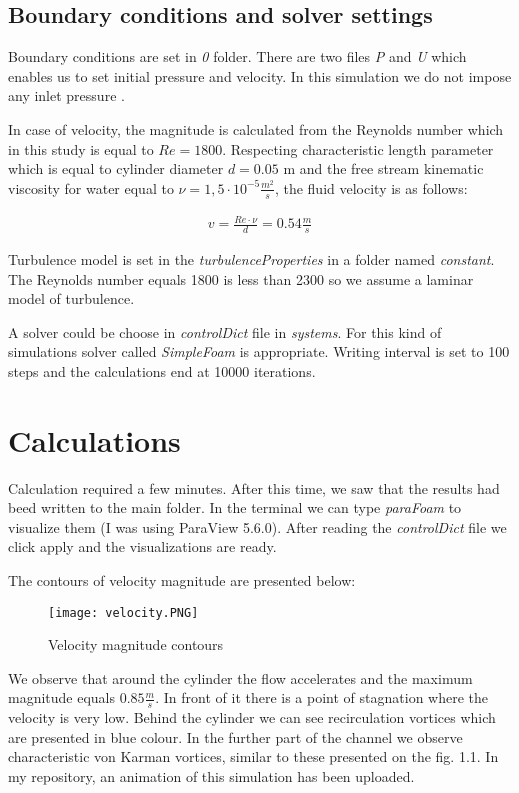 \documentclass[a4paper,11pt]{article}
\begin{document}
\subsection{Boundary conditions and solver settings}

Boundary conditions are set in \emph{0} folder. There are two files \emph{P} and \emph{U} which enables us to set initial pressure and velocity. In this simulation we do not impose any inlet pressure .

In case of velocity, the magnitude is calculated from the Reynolds number which in this study is equal to $Re = 1800$. Respecting characteristic length parameter which is equal to cylinder diameter $d=0.05 $ m and the free stream kinematic viscosity for water equal to $\nu=1,5\cdot10^{-5}\frac{m^{2}}{s}$, the fluid velocity is as follows:

\begin{gather*}
  v = \frac{Re\cdot\nu}{d} = 0.54 \frac{m}{s}
\end{gather*}

Turbulence model is set in the \emph{turbulenceProperties} in a folder named \emph{constant}. The Reynolds number equals 1800 is less than 2300 so we assume a laminar model of turbulence.

A solver could be choose in \emph{controlDict} file in \emph{systems}. For this kind of simulations solver called \emph{SimpleFoam} is appropriate. Writing interval is set to 100 steps and the calculations end at 10000 iterations.

\newpage

\section{Calculations}

Calculation required a few minutes. After this time, we saw that the results had beed written to the main folder. In the terminal we can type \emph{paraFoam} to visualize them (I was using ParaView 5.6.0). After reading the \emph{controlDict} file we click apply and the visualizations are ready.

The contours of velocity magnitude are presented below:

\begin{figure}[h]
  \centering
  \texttt{[image: velocity.PNG]}
  \caption{Velocity magnitude contours}
\end{figure}

We observe that around the cylinder the flow accelerates and the maximum magnitude equals $0.85\frac{m}{s}$. In front of it there is a point of stagnation where the velocity is very low. Behind the cylinder we can see recirculation vortices which are presented in blue colour. In the further part of the channel we observe characteristic von Karman vortices, similar to these presented on the fig. 1.1. In my repository, an animation of this simulation has been uploaded.
\end{document}
